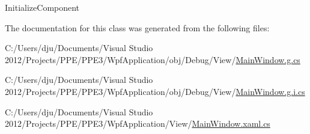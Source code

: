 Initialize\-Component 



The documentation for this class was generated from the following files\-:\begin{DoxyCompactItemize}
\item 
C\-:/\-Users/dju/\-Documents/\-Visual Studio 2012/\-Projects/\-P\-P\-E/\-P\-P\-E3/\-Wpf\-Application/obj/\-Debug/\-View/\hyperlink{_main_window_8g_8cs}{Main\-Window.\-g.\-cs}\item 
C\-:/\-Users/dju/\-Documents/\-Visual Studio 2012/\-Projects/\-P\-P\-E/\-P\-P\-E3/\-Wpf\-Application/obj/\-Debug/\-View/\hyperlink{_view_2_main_window_8g_8i_8cs}{Main\-Window.\-g.\-i.\-cs}\item 
C\-:/\-Users/dju/\-Documents/\-Visual Studio 2012/\-Projects/\-P\-P\-E/\-P\-P\-E3/\-Wpf\-Application/\-View/\hyperlink{_main_window_8xaml_8cs}{Main\-Window.\-xaml.\-cs}\end{DoxyCompactItemize}
